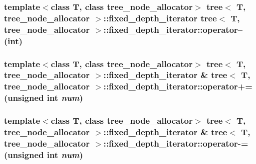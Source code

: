 \hypertarget{classtree_1_1fixed__depth__iterator_b404acdf3639ea5e5ce2ae65b77b94c7}{
\subsubsection{\setlength{\rightskip}{0pt plus 5cm}template$<$class T, class tree\_\-node\_\-allocator$>$ {\bf tree}$<$ T, tree\_\-node\_\-allocator $>$::{\bf fixed\_\-depth\_\-iterator} {\bf tree}$<$ T, tree\_\-node\_\-allocator $>$::fixed\_\-depth\_\-iterator::operator-- (int)}}
\label{classtree_1_1fixed__depth__iterator_b404acdf3639ea5e5ce2ae65b77b94c7}


\hypertarget{classtree_1_1fixed__depth__iterator_6909c400794c6feb49d75b99dbf6aa00}{
\subsubsection{\setlength{\rightskip}{0pt plus 5cm}template$<$class T, class tree\_\-node\_\-allocator$>$ {\bf tree}$<$ T, tree\_\-node\_\-allocator $>$::{\bf fixed\_\-depth\_\-iterator} \& {\bf tree}$<$ T, tree\_\-node\_\-allocator $>$::fixed\_\-depth\_\-iterator::operator+= (unsigned int {\em num})}}
\label{classtree_1_1fixed__depth__iterator_6909c400794c6feb49d75b99dbf6aa00}


\hypertarget{classtree_1_1fixed__depth__iterator_e8ccf119ae29e96044d9a4eeca2a539d}{
\subsubsection{\setlength{\rightskip}{0pt plus 5cm}template$<$class T, class tree\_\-node\_\-allocator$>$ {\bf tree}$<$ T, tree\_\-node\_\-allocator $>$::{\bf fixed\_\-depth\_\-iterator} \& {\bf tree}$<$ T, tree\_\-node\_\-allocator $>$::fixed\_\-depth\_\-iterator::operator-= (unsigned int {\em num})}}
\label{classtree_1_1fixed__depth__iterator_e8ccf119ae29e96044d9a4eeca2a539d}


